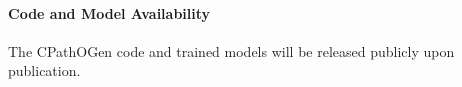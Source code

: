 \paragraph{Code and Model Availability}
The CPathOGen code and trained models will be released publicly upon publication.

